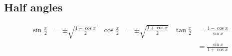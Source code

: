 \subsection*{Half angles}

\begin{align*}
  \sin \frac{x}{2}  &= \pm \sqrt{ \frac{1 - \cos x }{2} }
  &\cos \frac{x}{2}  &= \pm \sqrt{ \frac{1 + \cos x }{2} }
  &\tan \frac{x}{2}  &= \frac{1 - \cos x }{\sin x}\\
                    &&&&&= \frac{ \sin x }{ 1 + \cos x }
\end{align*}